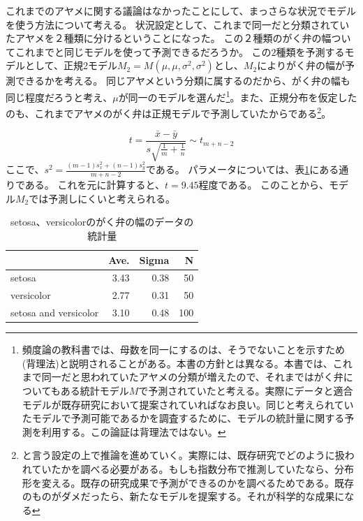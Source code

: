 これまでのアヤメに関する議論はなかったことにして、まっさらな状況でモデルを使う方法について考える。
状況設定として、これまで同一だと分類されていたアヤメを２種類に分けるということになった。
この２種類のがく弁の幅ついてこれまでと同じモデルを使って予測できるだろうか。
この$2$種類を予測するモデルとして、正規2モデル$M_2=M(\mu,\mu,\sigma^2,\sigma^2)$とし、$M_2$によりがく弁の幅が予測できるかを考える。
同じアヤメという分類に属するのだから、がく弁の幅も同じ程度だろうと考え、$\mu$が同一のモデルを選んだ\footnote{頻度論の教科書では、母数を同一にするのは、そうでないことを示すため(背理法)と説明されることがある。本書の方針とは異なる。本書では、これまで同一だと思われていたアヤメの分類が増えたので、それまではがく弁についてもある統計モデル$M$で予測されていたと考える。実際にデータと適合モデルが既存研究において提案されていればなお良い。同じと考えられていたモデルで予測可能であるかを調査するために、モデルの統計量に関する予測を利用する。この論証は背理法ではない。}。また、正規分布を仮定したのも、これまでアヤメのがく弁は正規モデルで予測していたからである\footnote{と言う設定の上で推論を進めていく。実際には、既存研究でどのように扱われていたかを調べる必要がある。もしも指数分布で推測していたなら、分布形を変える。既存の研究成果で予測ができるのかを調べるためである。既存のものがダメだったら、新たなモデルを提案する。それが科学的な成果になる}。

\begin{equation*}
    t = \frac{\bar{x}-\bar{y}}{s\sqrt{\frac{1}{m} + \frac{1}{n} }} \sim t_{m+n-2}
\end{equation*}
ここで、$s^2=\frac{(m-1)s_x^2+(n-1)s_y^2}{m+n-2}$である。
パラメータについては、表\ref{fig:seto_versi_speal_w_summary}にある通りである。
これを元に計算すると、$t=9.45$程度である。
このことから、モデル$M_2$では予測しにくいと考えられる。

\begin{table}
    \caption{setosa、versicolorのがく弁の幅のデータの統計量}
    \label{fig:seto_versi_speal_w_summary}
    \centering
    \begin{tabular}{lrrr}
        \hline
        {} &  Ave. &  Sigma &   N \\
        \hline \hline
        setosa     &  3.43 &   0.38 &  50 \\
        versicolor &  2.77 &   0.31 &  50 \\
        setosa and versicolor &  3.10 &   0.48 &  100 \\
        \hline
    \end{tabular}
\end{table}

